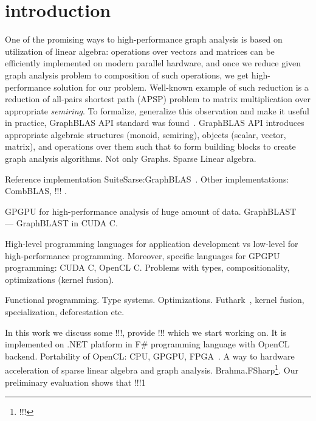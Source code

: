 \section{introduction}

One of the promising ways to high-performance graph analysis is based on utilization of linear algebra: operations over vectors and matrices can be efficiently implemented on modern parallel hardware, and once we reduce given graph analysis problem to composition of such operations, we get high-performance solution for our problem. 
Well-known example of such reduction is a reduction of all-pairs shortest path (APSP) problem to matrix multiplication over appropriate \textit{semiring}.
To formalize, generalize this observation and make it useful in practice, GraphBLAS API standard was found~\cite{7761646}. 
GraphBLAS API introduces appropriate algebraic structures (monoid, semiring), objects (scalar, vector, matrix), and operations over them such that to form building blocks to create graph analysis algorithms.  
Not only Graphs. Sparse Linear algebra. 

Reference implementation SuiteSarse:GraphBLAS~\cite{10.1145/3322125}.
Other implementations: CombBLAS, !!! .

GPGPU for high-performance analysis of huge amount of data. 
GraphBLAST~\cite{yang2019graphblast} --- GraphBLAST in CUDA C. 

High-level programming languages for application development vs low-level for high-performance programming.
Moreover, specific languages for GPGPU programming: CUDA C, OpenCL C.
Problems with types, compositionality, optimizations (kernel fusion).

Functional programming. Type systems. Optimizations. Futhark~\cite{Henriksen:2017:FPF:3062341.3062354}, kernel fusion, specialization, deforestation etc. 

In this work we discuss some !!!, provide !!! which we start working on. It is implemented on .NET platform in F\# programming language with OpenCL backend. 
Portability of OpenCL: CPU, GPGPU, FPGA~\cite{kenter2019invited,6567546}.
A way to hardware acceleration of sparse linear algebra and graph analysis.
Brahma.FSharp\footnote{!!!}.
Our preliminary evaluation shows that !!!1